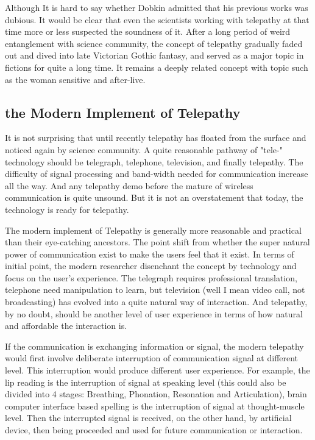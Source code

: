 \documentclass[a4paper]{article}
\begin{document}
Although It is hard to say whether Dobkin admitted that his previous works was dubious. It would be clear that even the scientists working with telepathy at that time more or less suspected the soundness of it. After a long period of weird entanglement with science community, the concept of telepathy gradually faded out and dived into late Victorian Gothic fantasy, and served as a major topic in fictions for quite a long time.\autocite{luckhurst2002invention} It remains a deeply related concept with topic such as the woman sensitive and after-live.

\subsection{the Modern Implement of Telepathy}

It is not surprising that until recently telepathy has floated from the surface and noticed again by science community. A quite reasonable pathway of "tele-" technology should be telegraph, telephone, television, and finally telepathy. The difficulty of signal processing and band-width needed for communication increase all the way. And any telepathy demo before the mature of wireless communication is quite unsound. But it is not an overstatement that today, the technology is ready for telepathy.

The modern implement of Telepathy is generally more reasonable and practical than their eye-catching ancestors. The point shift from whether the super natural power of communication exist to make the users feel that it exist. In terms of initial point, the modern researcher disenchant the concept by technology and focus on the user's experience. The telegraph requires professional translation, telephone need manipulation to learn, but television (well I mean video call, not broadcasting) has evolved into a quite natural way of interaction. And telepathy, by no doubt, should be another level of user experience in terms of how natural and affordable the interaction is. 

If the communication is exchanging information or signal, the modern telepathy would first involve deliberate interruption of communication signal at different level. This interruption would produce different user experience. For example, the lip reading is the interruption of signal at speaking level (this could also be divided into 4 stages: Breathing, Phonation, Resonation and Articulation), brain computer interface based spelling is the interruption of signal at thought-muscle level. Then the interrupted signal is received, on the other hand, by artificial device, then being proceeded and used for future communication or interaction.
\end{document}
